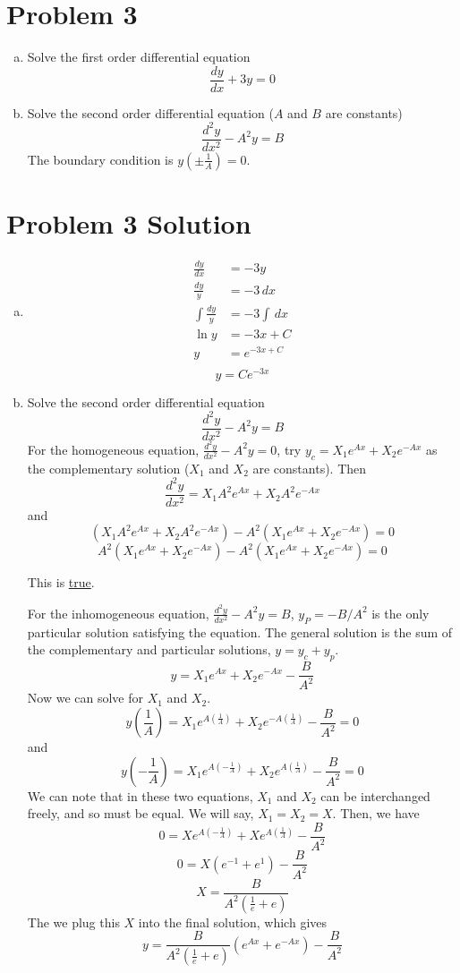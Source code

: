 \documentclass{report}
\begin{document}
\newpage
\section*{Problem 3}

\begin{enumerate}[a)]
\item Solve the first order differential equation
$$ \frac{dy}{dx} + 3y = 0 $$
\item Solve the second order differential equation ($A$ and $B$ are constants)
$$ \frac{d^2 y}{dx^2} - A^2y = B $$
The boundary condition is $y(\pm\frac{1}{A}) = 0$.
\end{enumerate}



\section*{Problem 3 Solution}
\begin{enumerate}[a)]

\item 

\begin{align*}
\frac{dy}{dx}	&= -3y \\
\frac{dy}{y} 	& = -3\,dx \\
\int\frac{dy}{y}&= -3 \int \,dx \\
\ln y			&= -3 x + C \\
y				&= e^{-3x + C} \\
\end{align*}
$$\boxed{y = Ce^{-3x}}$$

\item 

Solve the second order differential equation
$$ \frac{d^2 y}{dx^2} - A^2y = B $$
For the homogeneous equation, $\frac{d^2 y}{dx^2} - A^2y = 0$, try $y_c = X_1 e^{Ax} + X_2 e^{-Ax}$ as the complementary solution ($X_1$ and $X_2$ are constants). Then
$$ \frac{d^2 y}{dx^2} = X_1 A^2 e^{Ax} + X_2 A^2 e^{-Ax} $$
and
$$ (X_1 A^2 e^{Ax} + X_2 A^2 e^{-Ax}) - A^2(X_1 e^{Ax} + X_2 e^{-Ax}) = 0 $$
$$ A^2 (X_1 e^{Ax} + X_2 e^{-Ax}) - A^2 (X_1 e^{Ax} + X_2 e^{-Ax}) = 0 $$

This is \underline{true}.

For the inhomogeneous equation, $\frac{d^2 y}{dx^2} - A^2y = B$, $y_P = -B/A^2$ is the only particular solution satisfying the equation. The general solution is the sum of the complementary and particular solutions, $y = y_c + y_p$. 
$$ y = X_1 e^{Ax} + X_2 e^{-Ax} - \frac{B}{A^2} $$
Now we can solve for $X_1$ and $X_2$. 
$$ y(\frac{1}{A}) = X_1 e^{A(\frac{1}{A})} + X_2 e^{-A(\frac{1}{A})} - \frac{B}{A^2} = 0 $$
and
$$ y(-\frac{1}{A}) = X_1 e^{A(-\frac{1}{A})} + X_2 e^{A(\frac{1}{A})} - \frac{B}{A^2} = 0 $$
We can note that in these two equations, $X_1$ and $X_2$ can be interchanged freely, and so must be equal. We will say, $X_1 = X_2 = X$. Then, we have
$$ 0 = X e^{A(-\frac{1}{A})} + X e^{A(\frac{1}{A})} - \frac{B}{A^2} $$
$$ 0 = X (e^{-1} + e^{1}) - \frac{B}{A^2} $$
$$ X = \frac{B}{A^2(\frac{1}{e} + e)} $$
The we plug this $X$ into the final solution, which gives
$$ y = \frac{B}{A^2(\frac{1}{e} + e)} (e^{Ax} + e^{-Ax}) - \frac{B}{A^2} $$
\end{enumerate}
\end{document}
